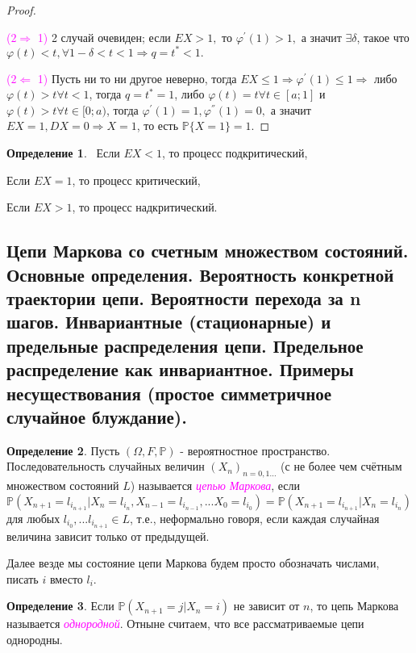 \documentclass[a4paper,100pt]{article}
\theoremstyle{indented}
\theoremstyle{definition}
\newtheorem{defn}{Определение}
\theoremstyle{remark}
\begin{document}
\begin{proof} \

        \textcolor{magenta}{($2 \Rightarrow$ 1)} 2 случай очевиден; если $EX>1,$ то $\varphi^{'}(1) > 1,$ а значит $\exists \delta$, такое что $\varphi(t) < t, \forall 1 - \delta < t < 1 \Rightarrow q = t^{*} < 1.$
        
        \textcolor{magenta}{($2 \Leftarrow$ 1)} Пусть ни то ни другое неверно, тогда $EX \leq 1 \Rightarrow \varphi^{'}(1) \leq 1 \Rightarrow$ либо $\varphi(t) > t \forall t < 1$, тогда $q = t^{*} = 1$, либо $\varphi(t) = t \forall t \in [a;1]$ и $\varphi(t) > t \forall t \in [0;a)$, тогда $\varphi^{'}(1) = 1, \varphi^{''}(1) = 0,$ а значит $EX = 1, DX = 0 \Rightarrow X = 1$, то есть $\mathbb P \{X = 1\} = 1$.
\end{proof}

\begin{defn} 
  \ 
    Если $EX < 1$, то процесс подкритический, \
    
    Если $EX = 1$, то процесс критический, \
    
    Если $EX > 1$, то процесс надкритический.
\end{defn}

\subsection{Цепи Маркова со счетным множеством состояний. Основные определения. Вероятность конкретной траектории цепи. Вероятности перехода за n шагов. Инвариантные (стационарные) и предельные распределения цепи. Предельное распределение как инвариантное. Примеры несуществования (простое симметричное случайное блуждание).}

\begin{defn}
Пусть $(\Omega, F, \mathbb{P})$ - вероятностное пространство. Последовательность случайных величин $(X_n)_{n=0, 1...}$ (с не более чем счётным множеством состояний $L$) называется \hypertarget{n29}{\textcolor{magenta}{\textit{цепью Маркова}}}, если $\mathbb{P}(X_{n+1}=l_{i_{n+1}} | X_n=l_{i_n}, X_{n-1}=l_{i_{n-1}}, ... X_0=l_{i_0})= \mathbb{P}(X_{n+1}=l_{i_{n+1}} | X_n=l_{i_n})$ для любых $l_{i_0}, ... l_{i_{n+1}} \in L$, т.е., неформально говоря, если каждая случайная величина зависит только от предыдущей.
\end{defn} 

Далее везде мы состояние цепи Маркова будем просто обозначать числами, писать $i$ вместо $l_i$.

\begin{defn}
Если $\mathbb{P}(X_{n+1}=j | X_n=i)$ не зависит от $n$, то цепь Маркова называется \hypertarget{n30}{\textcolor{magenta}{\textit{однородной}}}. Отныне считаем, что все рассматриваемые цепи однородны.
\end{defn}
\end{document}

